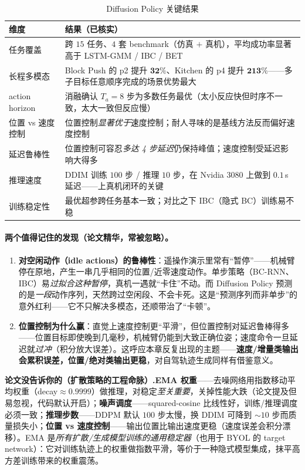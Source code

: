 \begin{table}[H]\centering\small
\caption{Diffusion Policy 关键结果}
\label{tab:de-dp-metrics}
\begin{tabular}{p{} p{}}
\toprule
维度 & 结果（已核实） \\
\midrule
任务覆盖 & 跨 $15$ 任务、$4$ 套 benchmark（仿真 $+$ 真机），平均成功率显著高于 LSTM-GMM / IBC / BET \\
长程多模态 & Block Push 的 p2 提升 $\mathbf{32\%}$、Kitchen 的 p4 提升 $\mathbf{213\%}$——多子目标任意顺序完成的场景优势最大 \\
action horizon & 消融确认 $T_a=8$ 步为多数任务最优（太小反应快但时序不一致，太大一致但反应慢） \\
位置 vs 速度控制 & 位置控制\emph{显著优于}速度控制；耐人寻味的是基线方法反而偏好速度控制 \\
延迟鲁棒性 & 位置控制可容忍\emph{多达 4 步延迟}仍保持峰值；速度控制受延迟影响大得多 \\
推理速度 & DDIM 训练 $100$ 步 / 推理 $10$ 步，在 Nvidia 3080 上做到 $\mathbf{0.1}$\,s 延迟——上真机闭环的关键 \\
训练稳定性 & 最优超参跨任务基本一致；对比之下 IBC（隐式 BC）训练易不稳 \\
\bottomrule
\end{tabular}
\end{table}

\paragraph{两个值得记住的发现（论文精华，常被忽略）。}
\begin{enumerate}
  \item \textbf{对空闲动作（idle actions）的鲁棒性}：遥操作演示里常有“暂停”——机械臂停在原地，产生一串几乎相同的位置/近零速度动作。单步策略（BC-RNN、IBC）易\emph{过拟合这种暂停}，真机一遇就“卡住”不动。而 Diffusion Policy 预测的是\emph{一段}动作序列，天然跨过空闲段、不会卡死。这是“预测序列而非单步”的意外红利——它不只解决多模态，还顺带治了“卡顿”。
  \item \textbf{位置控制为什么赢}：直觉上速度控制更“平滑”，但位置控制对延迟鲁棒得多——位置目标即使晚到几毫秒，机械臂仍能到大致正确位姿；速度命令一旦延迟就\emph{过冲}（积分放大误差）。这呼应本章反复出现的主题——\textbf{速度/增量类输出会累积误差，位置/绝对类输出更稳}，对自驾轨迹生成同样有借鉴意义。
\end{enumerate}

\begin{note}
\textbf{论文没告诉你的（扩散策略的工程命脉）.}\;\textbf{EMA 权重}——去噪网络用指数移动平均权重（decay$\approx0.9999$）做推理，对稳定\emph{至关重要}，关掉性能大跌（论文提及但易忽视，代码默认开启）；\textbf{噪声调度}——squared-cosine 比线性好，训练/推理调度必须一致；\textbf{推理步数}——DDPM 默认 $100$ 步太慢，换 DDIM 可降到 $\sim 10$ 步而质量损失小；\textbf{位置 vs 速度控制}——输出位置比输出速度更稳（速度误差会积分漂移）。EMA 是\emph{所有扩散/生成模型训练的通用稳定器}（也用于 BYOL 的 target network）：它对训练轨迹上的权重做指数平滑，等价于一种隐式模型集成，抹平高方差训练带来的权重震荡。
\end{note}

